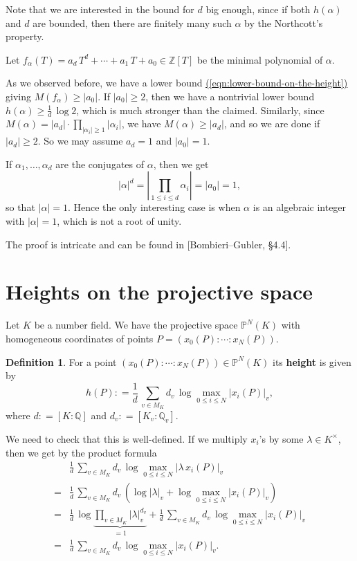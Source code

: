 \documentclass{article}
\newcommand{\eqnref}[1]{\hyperref[#1]{(\ref*{#1})}}
\theoremstyle{definition}
\newtheorem{definition}[proposition]{Definition}
\newcommand{\term}{\textbf}
\newcommand{\dfn}{\mathrel{\mathop:}=}
\newcommand{\ZZ}{\mathbb{Z}}
\newcommand{\QQ}{\mathbb{Q}}
\newcommand{\PP}{\mathbb{P}}
\begin{document}
\vspace{1em}

Note that we are interested in the bound for $d$ big enough, since if both
$h (\alpha)$ and $d$ are bounded, then there are finitely many such $\alpha$ by
the Northcott's property.

Let $f_\alpha (T) = a_d\,T^d + \cdots + a_1\,T + a_0 \in \ZZ [T]$ be the minimal
polynomial of $\alpha$.

As we observed before, we have a lower bound
\eqnref{eqn:lower-bound-on-the-height} giving $M (f_\alpha) \ge |a_0|$. If
$|a_0| \ge 2$, then we have a nontrivial lower bound
$h (\alpha) \ge \frac{1}{d}\,\log 2$, which is much stronger than the
claimed. Similarly, since
$M (\alpha) = |a_d| \cdot \prod_{|\alpha_i| \ge 1} |\alpha_i|$, we have
$M (\alpha) \ge |a_d|$, and so we are done if $|a_d| \ge 2$. So we may assume
$a_d = 1$ and $|a_0| = 1$.

If $\alpha_1, \ldots, \alpha_d$ are the conjugates of $\alpha$, then we get
$$|\alpha|^d = \left|\prod_{1 \le i \le d} \alpha_i\right| = |a_0| = 1,$$
so that $|\alpha| = 1$. Hence the only interesting case is when $\alpha$ is an
algebraic integer with $|\alpha| = 1$, which is not a root of unity.

\vspace{1em}

\noindent\frownie\frownie\frownie{} The proof is intricate and can be found in
[Bombieri--Gubler, \S 4.4].

\section{Heights on the projective space}

Let $K$ be a number field. We have the projective space $\PP^N (K)$ with
homogeneous coordinates of points $P = (x_0 (P) : \cdots : x_N (P))$.

\begin{definition}
  For a point $(x_0 (P) : \cdots : x_N (P)) \in \PP^N (K)$ its \term{height} is
  given by
  $$h (P) \dfn \frac{1}{d} \, \sum_{v\in M_K} d_v \, \log \max_{0\le i\le N} |x_i (P)|_v,$$
  where $d \dfn [K : \QQ]$ and $d_v \dfn [K_v : \QQ_v]$.
\end{definition}

We need to check that this is well-defined. If we multiply $x_i$'s by some
$\lambda \in K^\times$, then we get by the product formula
\begin{align*}
  & \frac{1}{d} \, \sum_{v\in M_K} d_v \, \log \max_{0\le i\le N} |\lambda\,x_i (P)|_v\\
  = & \frac{1}{d} \, \sum_{v\in M_K} d_v \, \left(\log |\lambda|_v + \log \max_{0\le i\le N} |x_i (P)|_v\right)\\
  = & \frac{1}{d} \, \log \underbrace{\prod_{v\in M_K} |\lambda|_v^{d_v}}_{= 1} + \frac{1}{d} \, \sum_{v\in M_K} d_v \, \log \max_{0\le i\le N} |x_i (P)|_v\\
  = & \frac{1}{d} \, \sum_{v\in M_K} d_v \, \log \max_{0\le i\le N} |x_i (P)|_v.
\end{align*}
\end{document}
